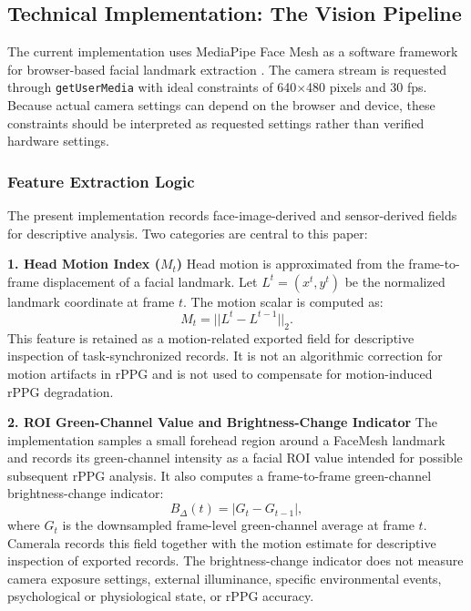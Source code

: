 \documentclass[dvipdfmx]{ehis}
\begin{document}
\subsection{Technical Implementation: The Vision Pipeline}
The current implementation uses MediaPipe Face Mesh as a software framework for browser-based facial landmark extraction \cite{mediapipe_framework}.
The camera stream is requested through \texttt{getUserMedia} with ideal constraints of 640$\times$480 pixels and 30 fps.
Because actual camera settings can depend on the browser and device, these constraints should be interpreted as requested settings rather than verified hardware settings.

\subsubsection{Feature Extraction Logic}
The present implementation records face-image-derived and sensor-derived fields for descriptive analysis.
Two categories are central to this paper:

\textbf{1. Head Motion Index ($M_t$)}
Head motion is approximated from the frame-to-frame displacement of a facial landmark.
Let $L^t = (x^t, y^t)$ be the normalized landmark coordinate at frame $t$.
The motion scalar is computed as:
\begin{equation}
    M_t = || L^t - L^{t-1} ||_2 .
\end{equation}
This feature is retained as a motion-related exported field for descriptive inspection of task-synchronized records.
It is not an algorithmic correction for motion artifacts in rPPG and is not used to compensate for motion-induced rPPG degradation.

\textbf{2. ROI Green-Channel Value and Brightness-Change Indicator}
The implementation samples a small forehead region around a FaceMesh landmark and records its green-channel intensity as a facial ROI value intended for possible subsequent rPPG analysis.
It also computes a frame-to-frame green-channel brightness-change indicator:
\begin{equation}
    B_{\Delta}(t) = | G_t - G_{t-1} | ,
\end{equation}
where $G_t$ is the downsampled frame-level green-channel average at frame $t$.
Camerala records this field together with the motion estimate for descriptive inspection of exported records.
The brightness-change indicator does not measure camera exposure settings, external illuminance, specific environmental events, psychological or physiological state, or rPPG accuracy.
\end{document}
